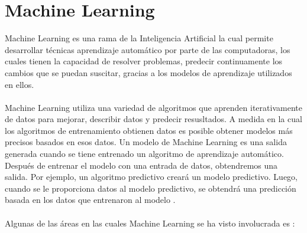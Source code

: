 \section{Machine Learning}

Machine Learning es una rama de la Inteligencia Artificial la cual permite  desarrollar técnicas aprendizaje 
automático por parte de las computadoras, los cuales tienen la capacidad de resolver problemas, predecir 
continuamente los cambios que se puedan suscitar, gracias a los modelos de aprendizaje utilizados en ellos.
\\\\
Machine Learning utiliza una variedad de algoritmos que aprenden iterativamente de datos para mejorar, describir 
datos y predecir resusltados. A medida en la cual los algoritmos de entrenamiento obtienen datos es posible obtener 
modelos más precisos basados en esos datos. Un modelo de Machine Learning es una salida generada cuando se tiene 
entrenado un algoritmo de aprendizaje automático. Después de entrenar el modelo con una entrada de datos, obtendremos 
una salida. Por ejemplo, un algoritmo predictivo creará un modelo predictivo. Luego, cuando se le proporciona datos 
al modelo predictivo, se obtendrá una predicción basada en los datos que entrenaron al modelo \citep{CT2}.
\\
\\
Algunas de las áreas en las cuales Machine Learning se ha visto involucrada es \citep{CT3}:
